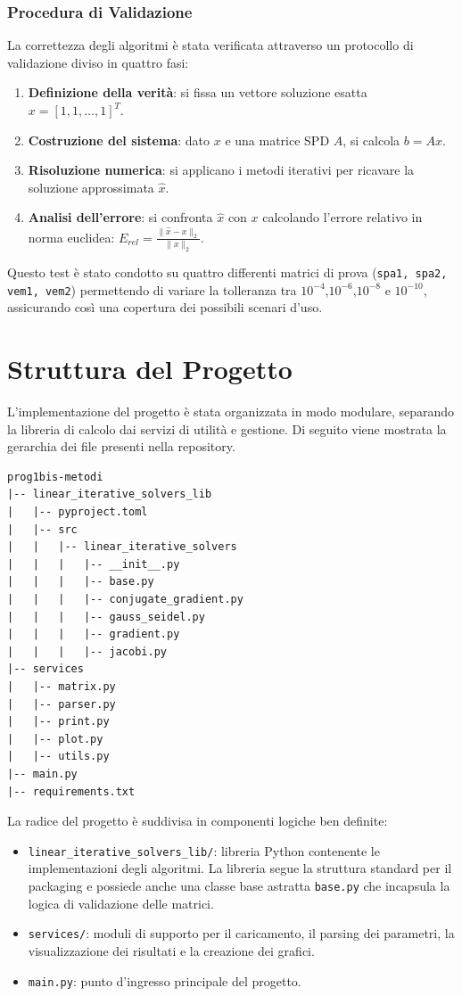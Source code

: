 \documentclass[a4paper, 12pt]{report}
\begin{document}
\subsection{Procedura di Validazione}
La correttezza degli algoritmi è stata verificata attraverso un protocollo di validazione diviso in quattro fasi:
\begin{enumerate}
    \item \textbf{Definizione della verità}: si fissa un vettore soluzione esatta $x = [1, 1, \dots, 1]^T$.
    \item \textbf{Costruzione del sistema}: dato $x$ e una matrice SPD $A$, si calcola $b = Ax$.
    \item \textbf{Risoluzione numerica}: si applicano i metodi iterativi per ricavare la soluzione approssimata $\hat{x}$.
    \item \textbf{Analisi dell'errore}: si confronta $\hat{x}$ con $x$ calcolando l'errore relativo in norma euclidea: $E_{rel} = \frac{\|\hat{x} - x\|_2}{\|x\|_2}$.
\end{enumerate}
Questo test è stato condotto su quattro differenti matrici di prova (\texttt{spa1, spa2, vem1, vem2}) permettendo di variare la tolleranza tra $10^{-4}$,$10^{-6}$,$10^{-8}$  e $10^{-10}$, assicurando così una copertura dei possibili scenari d'uso.


\chapter{Struttura del Progetto}
L'implementazione del progetto è stata organizzata in modo modulare, separando la libreria di calcolo dai servizi di utilità e gestione. Di seguito viene mostrata la gerarchia dei file presenti nella repository.

\begin{verbatim}
prog1bis-metodi
|-- linear_iterative_solvers_lib
|   |-- pyproject.toml
|   |-- src
|   |   |-- linear_iterative_solvers
|   |   |   |-- __init__.py
|   |   |   |-- base.py
|   |   |   |-- conjugate_gradient.py
|   |   |   |-- gauss_seidel.py
|   |   |   |-- gradient.py
|   |   |   |-- jacobi.py
|-- services
|   |-- matrix.py
|   |-- parser.py
|   |-- print.py
|   |-- plot.py
|   |-- utils.py
|-- main.py
|-- requirements.txt
\end{verbatim}

\noindent La radice del progetto è suddivisa in componenti logiche ben definite:
\begin{itemize}
    \item \texttt{linear\_iterative\_solvers\_lib/}: libreria Python contenente le implementazioni degli algoritmi. La libreria segue la struttura standard per il packaging e possiede anche una classe base astratta \texttt{base.py} che incapsula la logica di validazione delle matrici.
    \item \texttt{services/}: moduli di supporto per il caricamento, il parsing dei parametri, la visualizzazione dei risultati e la creazione dei grafici.
    \item \texttt{main.py}: punto d'ingresso principale del progetto.
\end{itemize}
\end{document}
